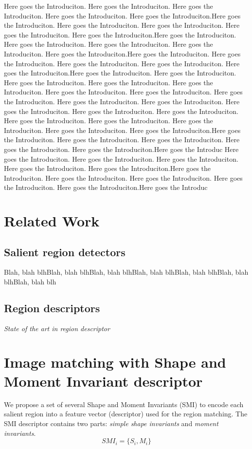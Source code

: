 \documentclass[a4paper,11pt]{article}
\begin{document}
Here goes the Introduciton. Here goes the Introduciton. Here goes the Introduciton. Here goes the Introduciton. Here goes the Introduciton.Here goes the Introduciton. Here goes the Introduciton. Here goes the Introduciton. Here goes the Introduciton. Here goes the Introduciton.Here goes the Introduciton. Here goes the Introduciton. Here goes the Introduciton. Here goes the Introduciton. Here goes the Introduciton.Here goes the Introduciton. Here goes the Introduciton. Here goes the Introduciton. Here goes the Introduciton. Here goes the Introduciton.Here goes the Introduciton. Here goes the Introduciton. Here goes the Introduciton. Here goes the Introduciton. Here goes the Introduciton. Here goes the Introduciton. Here goes the Introduciton. Here goes the Introduciton. Here goes the Introduciton. Here goes the Introduciton. Here goes the Introduciton. Here goes the Introduciton. Here goes the Introduciton.
Here goes the Introduciton. Here goes the Introduciton. Here goes the Introduciton. Here goes the Introduciton. Here goes the Introduciton.Here goes the Introduciton. Here goes the Introduciton. Here goes the Introduciton. Here goes the Introduciton. Here goes the Introduciton.Here goes the Introduc
Here goes the Introduciton. Here goes the Introduciton. Here goes the Introduciton. Here goes the Introduciton. Here goes the Introduciton.Here goes the Introduciton. Here goes the Introduciton. Here goes the Introduciton. Here goes the Introduciton. Here goes the Introduciton.Here goes the Introduc
\section{Related Work}

\subsection{Salient region detectors}
Blah, blah blhBlah, blah blhBlah, blah blhBlah, blah blhBlah, blah blhBlah, blah blhBlah, blah blh


\subsection{Region descriptors}
{\em State of the art in region descriptor}

\section{Image matching with Shape and Moment Invariant descriptor}
We propose a set of several Shape and Moment Invariants (SMI) to encode each salient region into a feature vector (descriptor) used for the region matching. 
The SMI descriptor contains two parts: {\em simple shape invariants}  and {\em moment invariants}.
\begin{equation}
SMI_i = \{S_i, M_i\}
\end{equation} \label{eq:smi}
\end{document}
